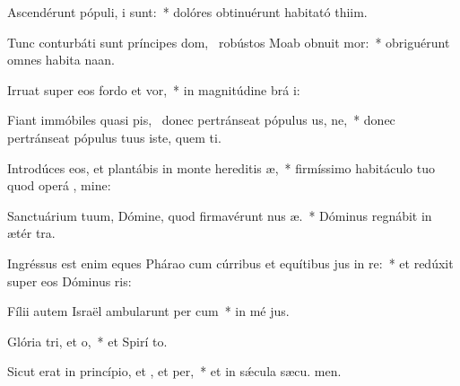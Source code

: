 \item Ascendérunt pópuli,  i sunt:~* dolóres obtinuérunt habitató thiim.
\item Tunc conturbáti sunt príncipes dom,~\pscross{} robústos Moab obnuit mor:~* obriguérunt omnes habita naan.
\item Irruat super eos fordo et vor,~* in magnitúdine brá i:
\item Fiant immóbiles quasi pis,~\pscross{} donec pertránseat pópulus us, ne,~* donec pertránseat pópulus tuus iste, quem ti.
\item Introdúces eos, et plantábis in monte hereditis æ,~* firmíssimo habitáculo tuo quod operá , mine:
\item Sanctuárium tuum, Dómine, quod firmavérunt nus æ.~* Dóminus regnábit in ætér  tra.
\item Ingréssus est enim eques Phárao cum cúrribus et equítibus jus in re:~* et redúxit super eos Dóminus  ris:
\item Fílii autem Israël ambularunt per cum~* in mé jus.
\item Glória tri, et o,~* et Spirí to.
\item Sicut erat in princípio, et , et per,~* et in sǽcula sæcu. men.

